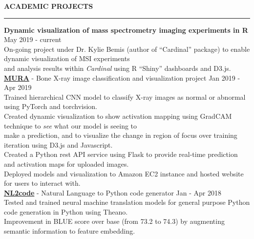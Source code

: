 \documentclass[a4paper]{article}
\newcommand{\myline}{\par
  \kern2pt %
  \hrule height 0.5pt
  \kern2pt %
}
\newcommand{\mybullet}{
	\indent \textbullet \hspace*{2mm}
}
\newcommand{\linetab}{
  \\ \hspace*{9mm}
}
\begin{document}
	
\noindent
{\large \textbf{ACADEMIC PROJECTS}}
\myline 
\smallskip

      \noindent
      \textbf{Dynamic visualization of mass spectrometry imaging experiments in R}
      \hfill May 2019 - current \\
      \mybullet On-going project under Dr. Kylie Bemis (author of ``Cardinal'' package) to enable 
      dynamic visualization of MSI experiments \linetab and analysis results within 
      \textit{Cardinal} using R ``Shiny'' dashboards and D3.js. \\

      \noindent
      \textbf{\href{https://github.com/DarkestFloyd/DS5500Project}{MURA}} - Bone X-ray image 
      classification and visualization project \hfill Jan 2019 - Apr 2019 \\
      \mybullet Trained hierarchical CNN model to classify X-ray images as normal or abnormal 
      using PyTorch and torchvision. \\
      \mybullet Created dynamic visualization to show activation mapping using GradCAM technique 
      to \textit{see} what our model is seeing to \linetab make a prediction, and to visualize the 
      change in region of focus over training iteration using D3.js and Javascript. \\
      \mybullet Created a Python rest API service using Flask to provide real-time prediction and 
      activation maps for uploaded images. \\
      \mybullet Deployed models and visualization to Amazon EC2 instance and hosted website for 
      users to interact with. \\

			\noindent
      \textbf{\href{https://github.com/DarkestFloyd/NL2code}{NL2code}} - Natural Language to 
      Python code generator \hfill Jan - Apr 2018 \\
      \mybullet Tested and trained neural machine translation models for general purpose Python 
      code generation in Python using Theano. \\
      \mybullet Improvement in BLUE score over base (from 73.2 to 74.3) by augmenting semantic 
      information to feature embedding. \\
\end{document}
